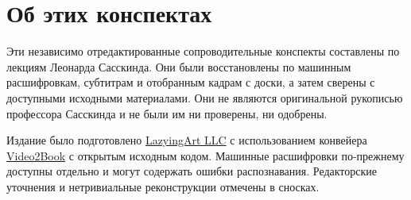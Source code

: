 \documentclass[11pt,oneside]{book}
\begin{document}
\frontmatter
\hypersetup{pageanchor=false}

\hypersetup{pageanchor=true}

\clearpage
\chapter*{Об этих конспектах}
Эти независимо отредактированные сопроводительные конспекты составлены по лекциям Леонарда Сасскинда. Они были восстановлены по машинным расшифровкам, субтитрам и отобранным кадрам с доски, а затем сверены с доступными исходными материалами. Они не являются оригинальной рукописью профессора Сасскинда и не были им ни проверены, ни одобрены.

Издание было подготовлено \href{https://lazying.art}{LazyingArt LLC} с использованием конвейера \href{https://github.com/lachlanchen/Video2Book}{Video2Book} с открытым исходным кодом. Машинные расшифровки по-прежнему доступны отдельно и могут содержать ошибки распознавания. Редакторские уточнения и нетривиальные реконструкции отмечены в сносках.
\clearpage
\tableofcontents
\mainmatter










\end{document}
